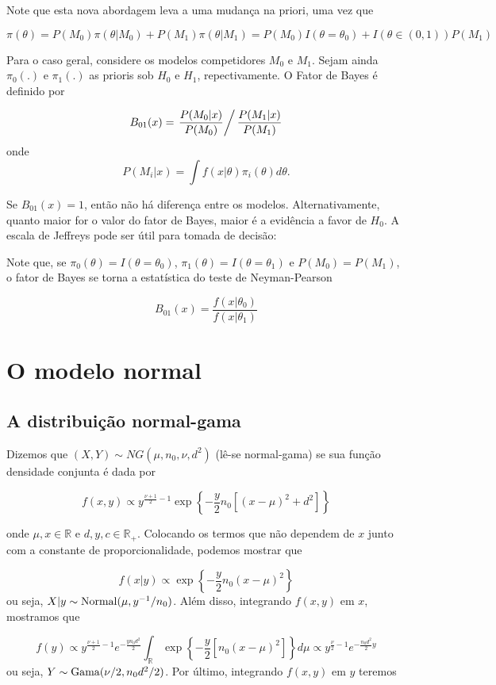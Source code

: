 \documentclass[
  letterpaper,
  DIV=11,
  numbers=noendperiod]{scrreprt}
\theoremstyle{definition}
\theoremstyle{definition}
\theoremstyle{plain}
\theoremstyle{remark}
\begin{document}
Note que esta nova abordagem leva a uma mudança na priori, uma vez que

\[\pi(\theta)=P(M_0)\pi(\theta|M_0)+P(M_1)\pi(\theta|M_1)=P(M_0)I(\theta=\theta_0)+I(\theta\in (0,1))P(M_1)\]

Para o caso geral, considere os modelos competidores \(M_0\) e \(M_1\).
Sejam ainda \(\pi_0(.)\) e \(\pi_1(.)\) as prioris sob \(H_0\) e
\(H_1\), repectivamente. O Fator de Bayes é definido por

\[B_{01}(x)=\left.\frac{P(M_0|x)}{P(M_0)}\right/ \frac{P(M_1|x)}{P(M_1)}\]
onde \[P(M_i|x)=\int f(x|\theta)\pi_i(\theta)d\theta.\]

Se \(B_{01}(x)=1\), então não há diferença entre os modelos.
Alternativamente, quanto maior for o valor do fator de Bayes, maior é a
evidência a favor de \(H_0\). A escala de Jeffreys pode ser útil para
tomada de decisão:

Note que, se \(\pi_0(\theta)=I(\theta=\theta_0)\),
\(\pi_1(\theta)=I(\theta=\theta_1)\) e \(P(M_0)=P(M_1)\), o fator de
Bayes se torna a estatística do teste de Neyman-Pearson

\[B_{01}(x)=\frac{f(x|\theta_0)}{f(x|\theta_1)}\]


\chapter{O modelo normal}\label{o-modelo-normal}

\section{A distribuição
normal-gama}\label{a-distribuiuxe7uxe3o-normal-gama}

Dizemos que \((X,Y)\sim NG(\mu,n_0,\nu,d^2)\) (lê-se normal-gama) se sua
função densidade conjunta é dada por

\[f(x,y)\propto y^{\frac{\nu+1}{2}-1}\exp\left\{-\frac{y}{2}n_0\left[(x-\mu)^2 + d^2\right]\right\}\]

onde \(\mu,x\in\mathbb{R}\) e \(d,y,c\in\mathbb{R}_+\). Colocando os
termos que não dependem de \(x\) junto com a constante de
proporcionalidade, podemos mostrar que

\[f(x|y)\propto \exp\left\{-\frac{y}{2}n_0(x-\mu)^2\right\}\] ou seja,
\(X|y\sim\hbox{Normal}(\mu,y^{-1}/n_0)\). Além disso, integrando
\(f(x,y)\) em \(x\), mostramos que

\[f(y)\propto y^{\frac{\nu+1}{2}-1}e^{-\frac{yn_0d^2}{2}}\int_{\mathbb{R}}\exp\left\{-\frac{y}{2}\left[n_0(x-\mu)^2\right]\right\}d\mu\propto y^{\frac{\nu}{2}-1}e^{-\frac{n_0d^2}{2}y}\]
ou seja, \(Y\sim\hbox{Gama}(\nu/2, n_0d^2/2)\). Por último, integrando
\(f(x,y)\) em \(y\) teremos
\end{document}
